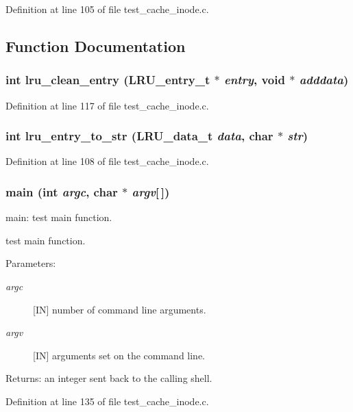 Definition at line 105 of file test\_\-cache\_\-inode.c.

\subsection{Function Documentation}
\subsubsection[{lru\_\-clean\_\-entry}]{\setlength{\rightskip}{0pt plus 5cm}int lru\_\-clean\_\-entry (LRU\_\-entry\_\-t $\ast$ {\em entry}, \/  void $\ast$ {\em adddata})}\label{test__cache__inode_8c_27ecbab481a3103e078489a212a52e3f}




Definition at line 117 of file test\_\-cache\_\-inode.c.
\subsubsection[{lru\_\-entry\_\-to\_\-str}]{\setlength{\rightskip}{0pt plus 5cm}int lru\_\-entry\_\-to\_\-str (LRU\_\-data\_\-t {\em data}, \/  char $\ast$ {\em str})}\label{test__cache__inode_8c_d3e6e5506644e1986e6475939863ad3e}




Definition at line 108 of file test\_\-cache\_\-inode.c.
\subsubsection[{main}]{\setlength{\rightskip}{0pt plus 5cm}main (int {\em argc}, \/  char $\ast$ {\em argv}[$\,$])}\label{test__cache__inode_8c_e0665038b72011f5c680c660fcb59459}


main: test main function.

test main function.

\begin{Desc}
\item[Parameters:]
\begin{description}
\item[{\em argc}][IN] number of command line arguments. \item[{\em argv}][IN] arguments set on the command line.\end{description}
\end{Desc}
\begin{Desc}
\item[Returns:]an integer sent back to the calling shell. \end{Desc}


Definition at line 135 of file test\_\-cache\_\-inode.c.